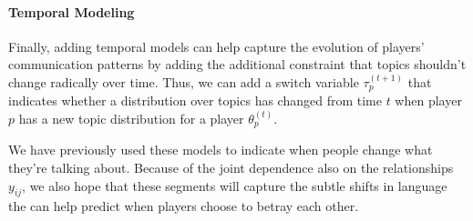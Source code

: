 \documentclass[11pt,letterpaper]{article}
\begin{document}
\paragraph{Temporal Modeling}

Finally, adding temporal models can help capture the evolution of
players' communication patterns by adding the additional constraint
that topics shouldn't change radically over time.  Thus, we can add a
switch variable $\tau_p^{(t+1)}$ that indicates whether a distribution
over topics has changed from time $t$ when player $p$ has a new topic
distribution for a player $\theta_p^{(t)}$.

We have previously used these models to indicate when people change
what they're talking about.  Because of the joint dependence also on
the relationships $y_{ij}$, we also hope that these segments will
capture the subtle shifts in language the can help predict when
players choose to betray each other.
\end{document}

